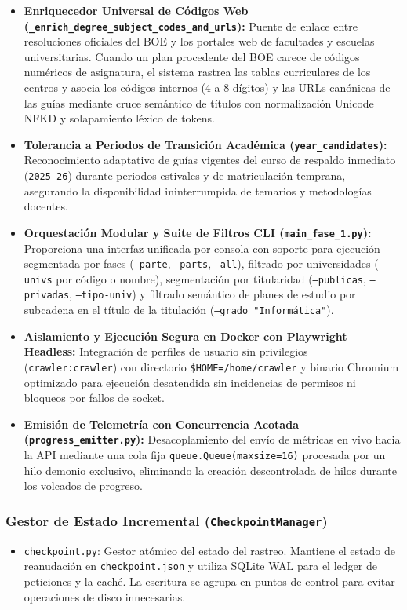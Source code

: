 \begin{itemize}
    \item \textbf{Enriquecedor Universal de Códigos Web (\texttt{\_enrich\_degree\_subject\_codes\_and\_urls}):} Puente de enlace entre resoluciones oficiales del BOE y los portales web de facultades y escuelas universitarias. Cuando un plan procedente del BOE carece de códigos numéricos de asignatura, el sistema rastrea las tablas curriculares de los centros y asocia los códigos internos (4 a 8 dígitos) y las URLs canónicas de las guías mediante cruce semántico de títulos con normalización Unicode NFKD y solapamiento léxico de tokens.
    \item \textbf{Tolerancia a Periodos de Transición Académica (\texttt{year\_candidates}):} Reconocimiento adaptativo de guías vigentes del curso de respaldo inmediato (\texttt{2025-26}) durante periodos estivales y de matriculación temprana, asegurando la disponibilidad ininterrumpida de temarios y metodologías docentes.
    \item \textbf{Orquestación Modular y Suite de Filtros CLI (\texttt{main\_fase\_1.py}):} Proporciona una interfaz unificada por consola con soporte para ejecución segmentada por fases (\texttt{--parte}, \texttt{--parts}, \texttt{--all}), filtrado por universidades (\texttt{--univs} por código o nombre), segmentación por titularidad (\texttt{--publicas}, \texttt{--privadas}, \texttt{--tipo-univ}) y filtrado semántico de planes de estudio por subcadena en el título de la titulación (\texttt{--grado "Informática"}).
    \item \textbf{Aislamiento y Ejecución Segura en Docker con Playwright Headless:} Integración de perfiles de usuario sin privilegios (\texttt{crawler:crawler}) con directorio \texttt{\$HOME=/home/crawler} y binario Chromium optimizado para ejecución desatendida sin incidencias de permisos ni bloqueos por fallos de socket.
    \item \textbf{Emisión de Telemetría con Concurrencia Acotada (\texttt{progress\_emitter.py}):} Desacoplamiento del envío de métricas en vivo hacia la API mediante una cola fija \texttt{queue.Queue(maxsize=16)} procesada por un hilo demonio exclusivo, eliminando la creación descontrolada de hilos durante los volcados de progreso.
\end{itemize}

\subsubsection{Gestor de Estado Incremental (\texttt{CheckpointManager})}
\begin{itemize}
    \item \texttt{checkpoint.py}: Gestor atómico del estado del rastreo. Mantiene el estado de reanudación en \texttt{checkpoint.json} y utiliza SQLite WAL para el ledger de peticiones y la caché. La escritura se agrupa en puntos de control para evitar operaciones de disco innecesarias.
\end{itemize}

